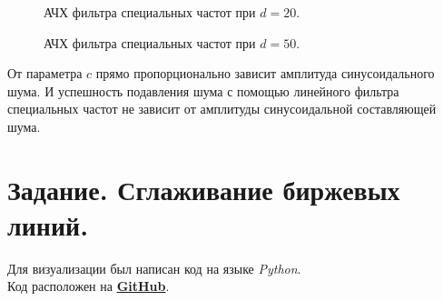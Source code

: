 \documentclass[a5paper, 10pt]{article}
\theoremstyle{definition}
\theoremstyle{plain}
\theoremstyle{remark}
\begin{document}
\begin{figure}[h!]
\caption{АЧХ фильтра специальных частот при $d=20$.}
\caption{АЧХ фильтра специальных частот при $d=50$.}
\end{figure}

\newpage
От параметра $c$ прямо пропорционально зависит амплитуда синусоидального шума. И успешность подавления шума с помощью линейного фильтра специальных частот не зависит от амплитуды синусоидальной составляющей шума.





\newpage
\section{Задание. Сглаживание биржевых линий.}


\newpage
Для визуализации был написан код на языке \textit{Python}. \\
Код расположен на \href{https://github.com/a-nechaeva/practical_Linal/tree/main/lab4}{\textbf{GitHub}}.
\end{document}

